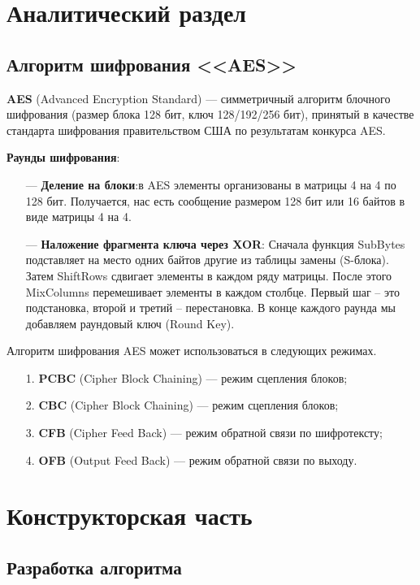 \chapter{Аналитический раздел}

\section{Алгоритм шифрования <<AES>>}

\textbf{AES} (Advanced Encryption Standard) --- симметричный алгоритм блочного шифрования (размер блока 128 бит, ключ 128/192/256 бит), принятый в качестве стандарта шифрования правительством США по результатам конкурса AES.

\textbf{Раунды шифрования}:

\begin{itemize}
	\item[---] \textbf{Деление на блоки}:в AES элементы организованы в матрицы 4 на 4 по 128 бит. Получается, нас есть сообщение размером 128 бит или 16 байтов в виде матрицы 4 на 4.
	\item[---] \textbf{Наложение фрагмента ключа через XOR}: Сначала функция SubBytes подставляет на место одних байтов другие из таблицы замены (S-блока). Затем ShiftRows сдвигает элементы в каждом ряду матрицы. После этого MixColumns перемешивает элементы в каждом столбце. Первый шаг – это подстановка, второй и третий – перестановка. В конце каждого раунда мы добавляем раундовый ключ (Round Key).
\end{itemize}

Алгоритм шифрования AES может использоваться в следующих режимах.

\begin{enumerate}
	\item[1.] \textbf{PCBC} (Cipher Block Chaining) --- режим сцепления блоков;
	\item[2.] \textbf{CBC} (Cipher Block Chaining) --- режим сцепления блоков;
	\item[3.] \textbf{CFB} (Cipher Feed Back) --- режим обратной связи по шифротексту;
	\item[4.] \textbf{OFB} (Output Feed Back) --- режим обратной связи по выходу.
\end{enumerate}

\chapter{Конструкторская часть}

\section{Разработка алгоритма}

